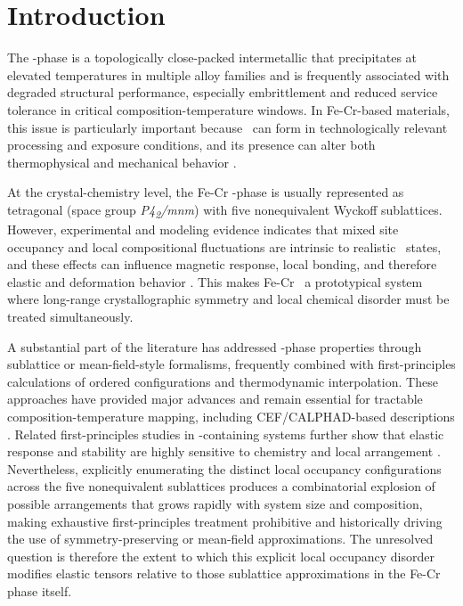 \documentclass[superscriptaddress, 12pt]{revtex4-2}%
\begin{document}
\section{Introduction}

The \textsigma-phase is a topologically close-packed intermetallic that precipitates at elevated temperatures in multiple alloy families and is frequently associated with degraded structural performance, especially embrittlement and reduced service tolerance in critical composition-temperature windows.
In Fe-Cr-based materials, this issue is particularly important because \textsigma~can form in technologically relevant processing and exposure conditions, and its presence can alter both thermophysical and mechanical behavior \cite{lit_1958_08_bungardt_archiv_fuer_das_eisenhuettenwesen,lit_2008_03_joubert_progress_in_materials_science,lit_2009_07_gorbunoff_journal_of_alloys_and_compounds,lit_2019_09_hajra_intermetallics,lit_2023_05_kishida_acta_materialia}.

At the crystal-chemistry level, the Fe-Cr \textsigma-phase is usually represented as tetragonal (space group \textit{P4\textsubscript{2}/mnm}) with five nonequivalent Wyckoff sublattices. 
However, experimental and modeling evidence indicates that mixed site occupancy and local compositional fluctuations are intrinsic to realistic \textsigma~states, and these effects can influence magnetic response, local bonding, and therefore elastic and deformation behavior \cite{lit_2012_09_kabliman_applied_sciences,lit_2017_01_cieslak_acta_materialia,lit_2023_05_kishida_acta_materialia}. 
This makes Fe-Cr \textsigma~a prototypical system where long-range crystallographic symmetry and local chemical disorder must be treated simultaneously.

A substantial part of the literature has addressed \textsigma-phase properties through sublattice or mean-field-style formalisms, frequently combined with first-principles calculations of ordered configurations and thermodynamic interpolation.
These approaches have provided major advances and remain essential for tractable composition-temperature mapping, including CEF/CALPHAD-based descriptions \cite{lit_2008_03_joubert_progress_in_materials_science,lit_2012_09_kabliman_applied_sciences,lit_2023_12_hallstedt_calphad}. 
Related first-principles studies in \textsigma-containing systems further show that elastic response and stability are highly sensitive to chemistry and local arrangement \cite{lit_2017_02_bonny_scripta_materialia,lit_2015_02_li_computational_materials_science,lit_2023_04_vesti_journal_of_nuclear_materials}.
Nevertheless, explicitly enumerating the distinct local occupancy configurations across the five nonequivalent sublattices produces a combinatorial explosion of possible arrangements that grows rapidly with system size and composition, making exhaustive first-principles treatment prohibitive and historically driving the use of symmetry-preserving or mean-field approximations.
The unresolved question is therefore the extent to which this explicit local occupancy disorder modifies elastic tensors relative to those sublattice approximations in the Fe-Cr \textsigma~ phase itself.
\end{document}
